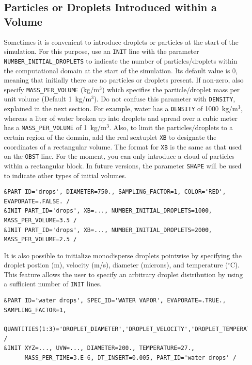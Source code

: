 \documentclass[11pt]{book}
\newcommand{\ct}{\tt\small}
\begin{document}
\subsection{Particles or Droplets Introduced within a Volume}

\label{info:initial_droplets}


Sometimes it is convenient to introduce droplets or particles at the start of the simulation. For this purpose, use an {\ct INIT} line with the parameter
{\ct NUMBER\_INITIAL\_DROPLETS} to indicate the number of particles/droplets within the computational domain at the start of the simulation. Its default value is 0, meaning that initially there are no particles or droplets present. If non-zero, also specify {\ct MASS\_PER\_VOLUME} (kg/m$^3$) which specifies the particle/droplet mass per unit volume (Default 1~kg/m$^3$). Do not confuse this parameter with {\ct DENSITY}, explained in the next section. For example, water has a {\ct DENSITY} of 1000~kg/m$^3$, whereas a liter of water broken up into droplets and spread over a cubic meter has a {\ct MASS\_PER\_VOLUME} of 1~kg/m$^3$. Also, to limit the particles/droplets to a certain region of the domain, add the real sextuplet {\ct XB} to designate the coordinates of a rectangular volume. The format for {\ct XB} is the same as that used on the {\ct OBST} line. For the moment, you can only introduce a cloud of particles within a rectangular block. In future versions, the parameter {\ct SHAPE} will be used to indicate other types of initial volumes.

\footnotesize
\begin{verbatim}
&PART ID='drops', DIAMETER=750., SAMPLING_FACTOR=1, COLOR='RED', EVAPORATE=.FALSE. /
&INIT PART_ID='drops', XB=..., NUMBER_INITIAL_DROPLETS=1000, MASS_PER_VOLUME=3.5 /
&INIT PART_ID='drops', XB=..., NUMBER_INITIAL_DROPLETS=2000, MASS_PER_VOLUME=2.5 /
\end{verbatim} \normalsize

It is also possible to initialize monodisperse droplets pointwise by specifying the droplet postion (m), velocity (m/s), diameter (microns), and temperature ($^\circ$C).  This feature allows the user to specify an arbitrary droplet distribution by using a sufficient number of {\ct INIT} lines.

\footnotesize
\begin{verbatim}
&PART ID='water drops', SPEC_ID='WATER VAPOR', EVAPORATE=.TRUE., SAMPLING_FACTOR=1,
      QUANTITIES(1:3)='DROPLET_DIAMETER','DROPLET_VELOCITY','DROPLET_TEMPERATURE' /
&INIT XYZ=..., UVW=..., DIAMETER=200., TEMPERATURE=27.,
      MASS_PER_TIME=3.E-6, DT_INSERT=0.005, PART_ID='water drops' /
\end{verbatim} \normalsize
\end{document}
